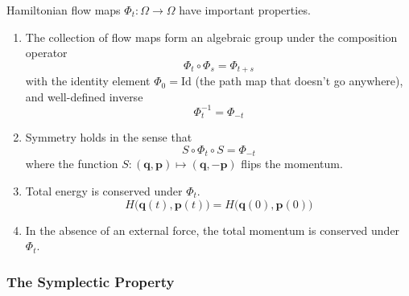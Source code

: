     Hamiltonian flow maps $\Phi_t : \Omega \longrightarrow \Omega$ have important properties. 
    \begin{enumerate}
        \item The collection of flow maps form an algebraic group under the composition operator
        \begin{equation}
          \Phi_t \circ \Phi_s = \Phi_{t + s}
        \end{equation}
        with the identity element $\Phi_0 = \mathrm{Id}$ (the path map that doesn't go anywhere), and well-defined inverse 
        \begin{equation}
          \Phi_t^{-1} = \Phi_{-t}
        \end{equation}
        \item Symmetry holds in the sense that 
        \begin{equation}
          S \circ \Phi_t \circ S = \Phi_{-t}
        \end{equation}
        where the function $S: (\mathbf{q}, \mathbf{p}) \mapsto (\mathbf{q}, -\mathbf{p})$ flips the momentum. 
        \item Total energy is conserved under $\Phi_t$. 
        \begin{equation}
          H\big( \mathbf{q}(t), \mathbf{p}(t) \big) = H\big( \mathbf{q}(0), \mathbf{p}(0) \big)
        \end{equation}
        \item In the absence of an external force, the total momentum is conserved under $\Phi_t$. 
    \end{enumerate}

    \subsubsection{The Symplectic Property}

